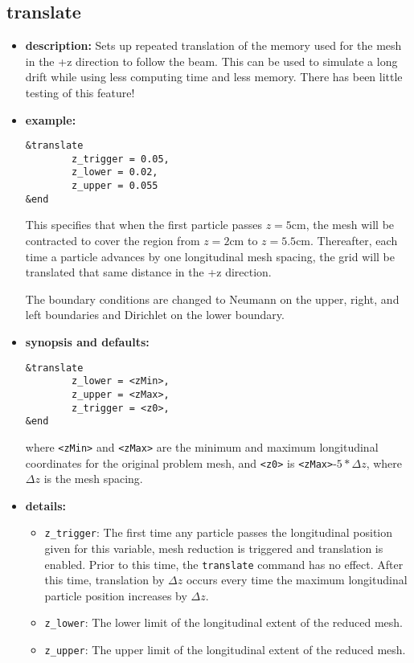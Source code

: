%
\newpage

\subsection{translate}

\begin{itemize}

\item {\bf description:}
Sets up repeated translation of the memory used for the mesh in the +z
direction to follow the beam.  This can be used to simulate a long
drift while using less computing time and less memory.  There has been
little testing of this feature!

\item {\bf example:} 
\begin{verbatim}
&translate
        z_trigger = 0.05,
        z_lower = 0.02,
        z_upper = 0.055
&end
\end{verbatim}
This specifies that when the first particle passes $z=5$cm, the
mesh will be contracted to cover the region from $z=2$cm to 
$z=5.5$cm.  Thereafter, each time a particle advances by one
longitudinal mesh spacing, the grid will be translated that same
distance in the +z direction.

The boundary conditions are changed to Neumann on the upper, right, and
left boundaries and Dirichlet on the lower boundary.  

\item {\bf synopsis and defaults:} 
\begin{verbatim}
&translate
        z_lower = <zMin>,
        z_upper = <zMax>,
        z_trigger = <z0>,
&end
\end{verbatim}
where \verb|<zMin>| and \verb|<zMax>| are the minimum and maximum longitudinal
coordinates for the original problem mesh, and \verb|<z0>| is \verb|<zMax>|-$5*\Delta z$,
where $\Delta z$ is the mesh spacing.

\item {\bf details:} 
\begin{itemize}
    \item {\tt z\_trigger}:  The first time any particle passes the longitudinal
        position given for this variable, mesh reduction is triggered and
        translation is enabled.  Prior to this time, the {\tt translate} command
        has no effect.  After this time, translation by $\Delta z$ occurs 
        every time the maximum longitudinal particle position increases by
        $\Delta z$.
    \item {\tt z\_lower}: The lower limit of the longitudinal extent of the
        reduced mesh.
    \item {\tt z\_upper}: The upper limit of the longitudinal extent of the
        reduced mesh.
\end{itemize}

\end{itemize}
